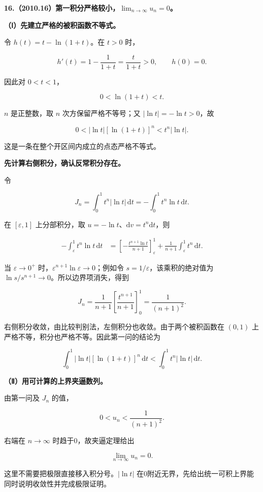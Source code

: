 \documentclass[UTF8,11pt,fontset=windows]{ctexart}
\begin{document}
\clearpage

\textbf{16.（2010.16）第一积分严格较小，$\displaystyle\lim_{n\to\infty}u_n=0$。}

\textbf{（Ⅰ）先建立严格的被积函数不等式。}

令 $h(t)=t-\ln(1+t)$。在 $t>0$ 时，

$$
h'(t)=1-\frac1{1+t}=\frac t{1+t}>0,
\qquad h(0)=0.
$$

因此对 $0<t<1$，

$$
0<\ln(1+t)<t.
$$

$n$ 是正整数，取 $n$ 次方保留严格不等号；又 $|\ln t|=-\ln t>0$，故

$$
0<|\ln t|[\ln(1+t)]^n<t^n|\ln t|.
$$

这是一条在整个开区间内成立的点态严格不等式。

\textbf{先计算右侧积分，确认反常积分存在。}

令

$$
J_n=\int_0^1t^n|\ln t|\,\mathrm dt
=-\int_0^1t^n\ln t\,\mathrm dt.
$$

在 $[\varepsilon,1]$ 上分部积分，取 $u=-\ln t$、$\mathrm dv=t^n\mathrm dt$，则

$$
\begin{aligned}
-\int_\varepsilon^1t^n\ln t\,\mathrm dt
&=\left[-\frac{t^{n+1}\ln t}{n+1}\right]_\varepsilon^1
+\frac1{n+1}\int_\varepsilon^1t^n\,\mathrm dt.
\end{aligned}
$$

当 $\varepsilon\to0^+$ 时，$\varepsilon^{n+1}\ln\varepsilon\to0$；例如令 $s=1/\varepsilon$，该乘积的绝对值为 $\ln s/s^{n+1}\to0$。所以边界项消失，得到

$$
J_n=\frac1{n+1}\left[\frac{t^{n+1}}{n+1}\right]_0^1
=\frac1{(n+1)^2}.
$$

右侧积分收敛，由比较判别法，左侧积分也收敛。由于两个被积函数在 $(0,1)$ 上严格不等，积分也严格不等。因此第一问的结论为

$$
\boxed{\int_0^1|\ln t|[\ln(1+t)]^n\,\mathrm dt
<\int_0^1t^n|\ln t|\,\mathrm dt}.
$$

\textbf{（Ⅱ）用可计算的上界夹逼数列。}

由第一问及 $J_n$ 的值，

$$
0<u_n<\frac1{(n+1)^2}.
$$

右端在 $n\to\infty$ 时趋于0，故夹逼定理给出

$$
\boxed{\lim_{n\to\infty}u_n=0}.
$$

这里不需要把极限直接移入积分号。$|\ln t|$ 在0附近无界，先给出统一可积上界能同时说明收敛性并完成极限证明。
\end{document}
